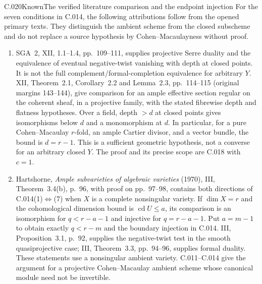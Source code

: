 \begin{saresult}{C.020}{Known}{The verified literature comparison and the endpoint injection}
For the seven conditions in C.014, the following attributions follow
from the opened primary texts. They distinguish the ambient scheme
from the closed subscheme and do not replace a source hypothesis by
Cohen--Macaulayness without proof.
\begin{enumerate}
\item SGA~2, XII, 1.1--1.4, pp.~109--111, supplies projective
Serre duality and the equivalence of eventual negative-twist
vanishing with depth at closed points. It is not the full
complement/formal-completion equivalence for arbitrary $Y$.
XII, Theorem~2.1, Corollary~2.2 and Lemma~2.3,
pp.~114--115 (original margins 143--144), give comparison for
an ample effective section regular on the coherent sheaf, in a
projective family, with the stated fibrewise depth and flatness
hypotheses. Over a field, depth $>d$ at closed points gives
isomorphisms below $d$ and a monomorphism at $d$. In particular,
for a pure Cohen--Macaulay $r$-fold, an ample Cartier divisor,
and a vector bundle, the bound is $d=r-1$. This is a sufficient
geometric hypothesis, not a converse for an arbitrary closed $Y$.
The proof and its precise scope are C.018 with $c=1$.

\item Hartshorne, \emph{Ample subvarieties of algebraic varieties}
(1970), III, Theorem~3.4(b), p.~96, with proof on pp.~97--98,
contains both directions of C.014(1)$\Longleftrightarrow$(7)
when $X$ is a complete nonsingular variety. If $\dim X=r$ and
the cohomological dimension bound is $\operatorname{cd}U\leq a$,
its comparison is an isomorphism for $q<r-a-1$ and injective
for $q=r-a-1$. Put $a=m-1$ to obtain exactly $q<r-m$ and
the boundary injection in C.014. III, Proposition~3.1,
p.~92, supplies the negative-twist test in the smooth
quasiprojective case; III, Theorem~3.3, pp.~94--96, supplies
formal duality. These statements use a nonsingular ambient
variety. C.011--C.014 give the argument for a projective
Cohen--Macaulay ambient scheme whose canonical module need
not be invertible.


\end{enumerate}
\end{saresult}

